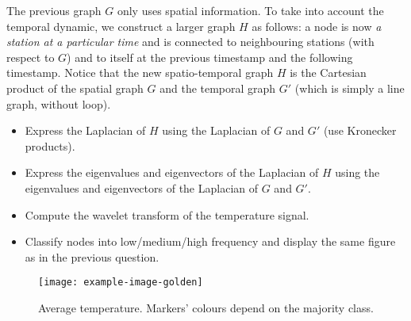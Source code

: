 \documentclass[11pt]{article}
\begin{document}
\newpage
\begin{exercise}
The previous graph $G$ only uses spatial information.
To take into account the temporal dynamic, we construct a larger graph $H$ as follows: a node is now \textit{a station at a particular time} and is connected to neighbouring stations (with respect to $G$) and to itself at the previous timestamp and the following timestamp.
Notice that the new spatio-temporal graph $H$ is the Cartesian product of the spatial graph $G$ and the temporal graph $G'$ (which is simply a line graph, without loop).

\begin{itemize}
    \item Express the Laplacian of $H$ using the Laplacian of $G$ and $G'$ (use Kronecker products).
    \item Express the eigenvalues and eigenvectors of the Laplacian of $H$ using the eigenvalues and eigenvectors of the Laplacian of $G$ and $G'$.
    \item Compute the wavelet transform of the temperature signal.
    \item Classify nodes into low/medium/high frequency and display the same figure as in the previous question.
\end{itemize}
\end{exercise}

\begin{solution}
\begin{figure}
    \centering
    \begin{minipage}[t]{0.8\textwidth}
    \centerline{\texttt{[image: example-image-golden]}}
    \end{minipage}
    \caption{Average temperature. Markers' colours depend on the majority class.}
\end{figure}
\end{solution}
\end{document}

